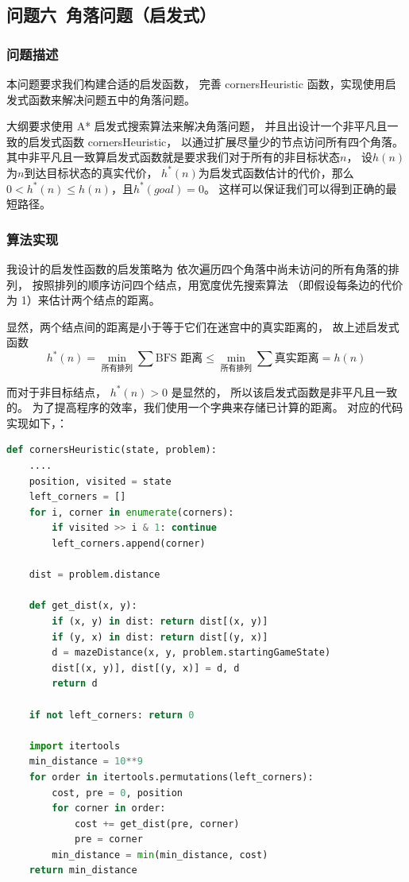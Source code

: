\documentclass[12pt,onecolumn]{report}
\theoremstyle{plain}
\numberwithin{figure}{section}
\begin{document}
\subsection{问题六~角落问题（启发式）}
\subsubsection{问题描述}
本问题要求我们构建合适的启发函数，
完善 cornersHeuristic 函数，实现使用启发式函数来解决问题五中的角落问题。

大纲要求使用 A* 启发式搜索算法来解决角落问题，
并且出设计一个非平凡且一致的启发式函数 cornersHeuristic，
以通过扩展尽量少的节点访问所有四个角落。
其中非平凡且一致算启发式函数就是要求我们对于所有的非目标状态$n$，
设$h(n)$为$n$到达目标状态的真实代价，
$h^*(n)$为启发式函数估计的代价，那么$0 < h^*(n) \le h(n)$，且$h^*(goal) = 0$。
这样可以保证我们可以得到正确的最短路径。

\subsubsection{算法实现}
我设计的启发性函数的启发策略为
依次遍历四个角落中尚未访问的所有角落的排列，
按照排列的顺序访问四个结点，用宽度优先搜索算法
（即假设每条边的代价为 1）来估计两个结点的距离。

显然，两个结点间的距离是小于等于它们在迷宫中的真实距离的，
故上述启发式函数
\[h^{*}(n) = \min_{\text{所有排列}}\sum\text{BFS 距离}
  \le \min_{\text{所有排列}}\sum\text{真实距离} = h(n)\]

而对于非目标结点， $h^{*}(n) > 0$ 是显然的，
所以该启发式函数是非平凡且一致的。
为了提高程序的效率，我们使用一个字典来存储已计算的距离。
对应的代码实现如下，：

\begin{lstlisting}[language=python]
def cornersHeuristic(state, problem):
    ....
    position, visited = state
    left_corners = []
    for i, corner in enumerate(corners):
        if visited >> i & 1: continue
        left_corners.append(corner)

    dist = problem.distance

    def get_dist(x, y):
        if (x, y) in dist: return dist[(x, y)]
        if (y, x) in dist: return dist[(y, x)]
        d = mazeDistance(x, y, problem.startingGameState)
        dist[(x, y)], dist[(y, x)] = d, d
        return d

    if not left_corners: return 0

    import itertools
    min_distance = 10**9
    for order in itertools.permutations(left_corners):
        cost, pre = 0, position
        for corner in order:
            cost += get_dist(pre, corner)
            pre = corner
        min_distance = min(min_distance, cost)
    return min_distance
\end{lstlisting}
\end{document}

